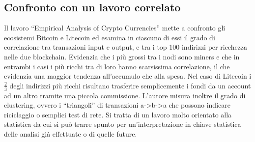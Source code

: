 \subsection{Confronto con un lavoro correlato}
Il lavoro “Empirical Analysis of Crypto Currencies”\cite{relatedwork} mette a confronto gli ecosistemi Bitcoin e Litecoin ed esamina in ciascuno di essi il grado di correlazione tra transazioni input e output, e tra i top 100 indirizzi per ricchezza nelle due blockchain. Evidenzia che i più grossi tra i nodi sono miners e che in entrambi i casi i più ricchi tra di loro hanno scarsissima correlazione, il che evidenzia una maggior tendenza all’accumulo che alla spesa. Nel caso di Litecoin i $\frac{2}{3}$ degli indirizzi più ricchi risultano trasferire semplicemente i fondi da un account ad un altro tramite una piccola commissione.
L'autore misura inoltre il grado di clustering, ovvero i “triangoli” di transazioni a->b->a che possono indicare riciclaggio o semplici test di rete. Si tratta di un lavoro molto orientato alla statistica da cui si può trarre spunto per un'interpretazione in chiave statistica delle analisi già effettuate o di quelle future. 

